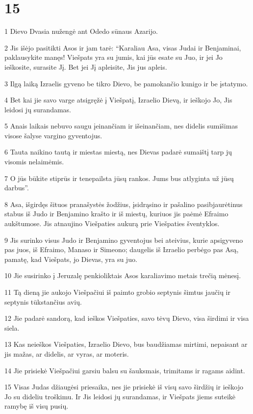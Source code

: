 \chapter{15}

\par 1 Dievo Dvasia nužengė ant Odedo sūnaus Azarijo. 
\par 2 Jis išėjo pasitikti Asos ir jam tarė: “Karaliau Asa, visas Judai ir Benjaminai, paklausykite manęs! Viešpats yra su jumis, kai jūs esate su Juo, ir jei Jo ieškosite, surasite Jį. Bet jei Jį apleisite, Jis jus apleis. 
\par 3 Ilgą laiką Izraelis gyveno be tikro Dievo, be pamokančio kunigo ir be įstatymo. 
\par 4 Bet kai jie savo varge atsigręžė į Viešpatį, Izraelio Dievą, ir ieškojo Jo, Jis leidosi jų surandamas. 
\par 5 Anais laikais nebuvo saugu įeinančiam ir išeinančiam, nes didelis sumišimas visose šalyse vargino gyventojus. 
\par 6 Tauta naikino tautą ir miestas miestą, nes Dievas padarė sumaištį tarp jų visomis nelaimėmis. 
\par 7 O jūs būkite stiprūs ir tenepailsta jūsų rankos. Jums bus atlyginta už jūsų darbus”. 
\par 8 Asa, išgirdęs šituos pranašystės žodžius, įsidrąsino ir pašalino pasibjaurėtinus stabus iš Judo ir Benjamino krašto ir iš miestų, kuriuos jis paėmė Efraimo aukštumose. Jis atnaujino Viešpaties aukurą prie Viešpaties šventyklos. 
\par 9 Jis surinko visus Judo ir Benjamino gyventojus bei ateivius, kurie apsigyveno pas juos, iš Efraimo, Manaso ir Simeono; daugelis iš Izraelio perbėgo pas Asą, pamatę, kad Viešpats, jo Dievas, yra su juo. 
\par 10 Jie susirinko į Jeruzalę penkioliktais Asos karaliavimo metais trečią mėnesį. 
\par 11 Tą dieną jie aukojo Viešpačiui iš paimto grobio septynis šimtus jaučių ir septynis tūkstančius avių. 
\par 12 Jie padarė sandorą, kad ieškos Viešpaties, savo tėvų Dievo, visa širdimi ir visa siela. 
\par 13 Kas neieškos Viešpaties, Izraelio Dievo, bus baudžiamas mirtimi, nepaisant ar jis mažas, ar didelis, ar vyras, ar moteris. 
\par 14 Jie prisiekė Viešpačiui garsiu balsu su šauksmais, trimitams ir ragams aidint. 
\par 15 Visas Judas džiaugėsi priesaika, nes jie prisiekė iš visų savo širdžių ir ieškojo Jo su dideliu troškimu. Ir Jis leidosi jų surandamas, ir Viešpats jiems suteikė ramybę iš visų pusių. 
